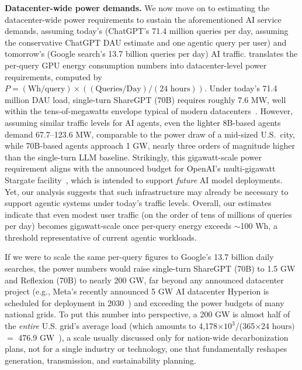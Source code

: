 \textbf{Datacenter-wide power demands.} We now move on to estimating the datacenter-wide power requirements to sustain the aforementioned AI service demands, assuming today's (ChatGPT's 71.4 million queries per day, assuming the conservative ChatGPT DAU estimate and one agentic query per user) and tomorrow's (Google search's 13.7 billion queries per day) AI traffic.  translates the per-query GPU energy consumption numbers into datacenter-level power requirements, computed by $P=(\text{Wh/query})\times ((\text{Queries/Day})/(24\text{ hours}))$. Under today’s 71.4 million DAU load, single-turn ShareGPT (70B) requires roughly 7.6 MW, well within the tens-of-megawatts envelope typical of modern datacenters~\cite{hyperscale_datacenter,xAI_collosus}. However, assuming similar traffic levels for AI agents, even the lighter 8B-based agents demand 67.7–123.6 MW, comparable to the power draw of a mid-sized U.S.\ city, while 70B-based agents approach 1 GW, nearly three orders of magnitude higher than the single-turn LLM baseline. Strikingly, this gigawatt-scale power requirement aligns with the announced budget for OpenAI’s multi-gigawatt Stargate facility~\cite{openai_stargate}, which is intended to support \emph{future} AI model deployments. Yet, our analysis suggests that such infrastructure may already be necessary to support agentic systems under today’s traffic levels. Overall, our estimates indicate that even modest user traffic (on the order of tens of millions of queries per day) becomes gigawatt-scale once per-query energy exceeds \(\sim\)100 Wh, a threshold representative of current agentic workloads.

If we were to scale the same per-query figures to Google’s 13.7 billion daily searches, the power numbers would raise single-turn ShareGPT (70B) to 1.5 GW and Reflexion (70B) to nearly 200 GW, far beyond any announced datacenter project (e.g., Meta's recently announced 5 GW AI datacenter Hyperion is scheduled for deployment in 2030~\cite{meta_hyperion_prometheus}) and exceeding the power budgets of many national grids. To put this number into perspective, a 200 GW is almost half of the \emph{entire} U.S. grid's average load (which amounts to 4,178$\times10^3$/(365$\times$24$\text{ hours})$$=$ 476.9$\text{ GW}$~\cite{us_grid_load}), a scale usually discussed only for nation-wide decarbonization plans, not for a single industry or technology, one that fundamentally reshapes generation, transmission, and sustainability planning.

